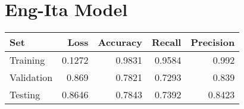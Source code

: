 \documentclass{article}%
\begin{document}
%
\section{Eng{-}Ita Model}%
\label{sec:Eng{-}ItaModel}%
\begin{center}%
\begin{tabular}[centered]{l||r r r r}%
Set&Loss&Accuracy&Recall&Precision\\%
\hline%
\hline%
Training&0.1272&0.9831&0.9584&0.992\\%
Validation&0.869&0.7821&0.7293&0.839\\%
Testing&0.8646&0.7843&0.7392&0.8423\\%
\end{tabular}%
\end{center}

%
\end{document}
